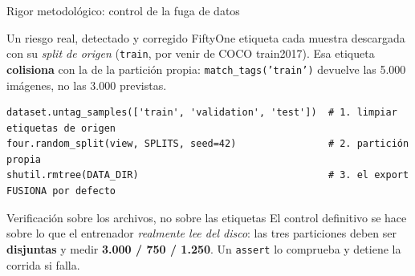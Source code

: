 \documentclass[aspectratio=169,11pt]{beamer}
\begin{document}
\begin{frame}[fragile]{Rigor metodológico: control de la fuga de datos}
  \begin{alertblock}{Un riesgo real, detectado y corregido}
    FiftyOne etiqueta cada muestra descargada con su \emph{split de origen}
    (\texttt{train}, por venir de COCO train2017). Esa etiqueta \textbf{colisiona} con la
    de la partición propia: \texttt{match\_tags('train')} devuelve las 5.000 imágenes, no
    las 3.000 previstas.
  \end{alertblock}

  \vspace{0.4em}
\begin{lstlisting}[style=py]
dataset.untag_samples(['train', 'validation', 'test'])  # 1. limpiar etiquetas de origen
four.random_split(view, SPLITS, seed=42)                # 2. partición propia
shutil.rmtree(DATA_DIR)                                 # 3. el export FUSIONA por defecto
\end{lstlisting}

  \vspace{0.4em}
  \begin{exampleblock}{Verificación sobre los archivos, no sobre las etiquetas}
    El control definitivo se hace sobre lo que el entrenador \emph{realmente lee del disco}:
    las tres particiones deben ser \textbf{disjuntas} y medir \textbf{3.000 / 750 / 1.250}.
    Un \texttt{assert} lo comprueba y detiene la corrida si falla.
  \end{exampleblock}
\end{frame}
\end{document}
